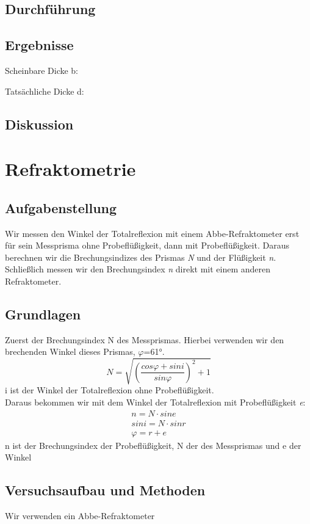 \documentclass{article}
\begin{document}
\subsection{Durchführung}
\subsection{Ergebnisse}
Scheinbare Dicke b:

Tatsächliche Dicke d:


\subsection{Diskussion}

\section{Refraktometrie}

\subsection{Aufgabenstellung}
Wir messen den Winkel der Totalreflexion mit einem Abbe-Refraktometer erst für sein Messprisma ohne Probeflüßigkeit, dann mit Probeflüßigkeit. Daraus berechnen wir die Brechungsindizes des Prismas \textit{N} und der Flüßigkeit \textit{n}. Schließlich messen wir den Brechungsindex \textit{n} direkt mit einem anderen Refraktometer. 
\subsection{Grundlagen}
Zuerst der Brechungsindex N des Messprismas. Hierbei verwenden wir den brechenden Winkel dieses Prismas, $\varphi$=61°.
\begin{equation}
\label{NMessprisma}
N=\sqrt{(\frac{cos\varphi + sin i}{sin \varphi})^2+1}
\end{equation}
i ist der Winkel der Totalreflexion ohne Probeflüßigkeit. \\
Daraus bekommen wir mit dem Winkel der Totalreflexion mit Probeflüßigkeit \textit{e}:
\begin{align}
n=N \cdot sin e \\
sin i= N \cdot sin r \\
\varphi = r + e
\end{align}
n ist der Brechungsindex der Probeflüßigkeit, N der des Messprismas und e der Winkel 
\subsection{Versuchsaufbau und Methoden}
Wir verwenden ein Abbe-Refraktometer
\end{document}
